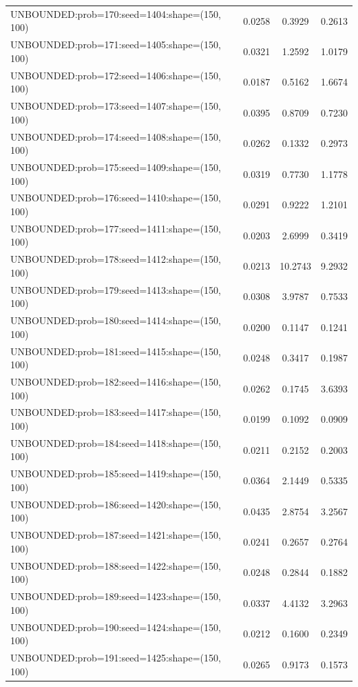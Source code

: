 \begin{longtable}{lccc}
UNBOUNDED:prob=170:seed=1404:shape=(150, 100) &   0.0258 &  0.3929 &  0.2613 \\
UNBOUNDED:prob=171:seed=1405:shape=(150, 100) &   0.0321 &  1.2592 &  1.0179 \\
UNBOUNDED:prob=172:seed=1406:shape=(150, 100) &   0.0187 &  0.5162 &  1.6674 \\
UNBOUNDED:prob=173:seed=1407:shape=(150, 100) &   0.0395 &  0.8709 &  0.7230 \\
UNBOUNDED:prob=174:seed=1408:shape=(150, 100) &   0.0262 &  0.1332 &  0.2973 \\
UNBOUNDED:prob=175:seed=1409:shape=(150, 100) &   0.0319 &  0.7730 &  1.1778 \\
UNBOUNDED:prob=176:seed=1410:shape=(150, 100) &   0.0291 &  0.9222 &  1.2101 \\
UNBOUNDED:prob=177:seed=1411:shape=(150, 100) &   0.0203 &  2.6999 &  0.3419 \\
UNBOUNDED:prob=178:seed=1412:shape=(150, 100) &   0.0213 & 10.2743 &  9.2932 \\
UNBOUNDED:prob=179:seed=1413:shape=(150, 100) &   0.0308 &  3.9787 &  0.7533 \\
UNBOUNDED:prob=180:seed=1414:shape=(150, 100) &   0.0200 &  0.1147 &  0.1241 \\
UNBOUNDED:prob=181:seed=1415:shape=(150, 100) &   0.0248 &  0.3417 &  0.1987 \\
UNBOUNDED:prob=182:seed=1416:shape=(150, 100) &   0.0262 &  0.1745 &  3.6393 \\
UNBOUNDED:prob=183:seed=1417:shape=(150, 100) &   0.0199 &  0.1092 &  0.0909 \\
UNBOUNDED:prob=184:seed=1418:shape=(150, 100) &   0.0211 &  0.2152 &  0.2003 \\
UNBOUNDED:prob=185:seed=1419:shape=(150, 100) &   0.0364 &  2.1449 &  0.5335 \\
UNBOUNDED:prob=186:seed=1420:shape=(150, 100) &   0.0435 &  2.8754 &  3.2567 \\
UNBOUNDED:prob=187:seed=1421:shape=(150, 100) &   0.0241 &  0.2657 &  0.2764 \\
UNBOUNDED:prob=188:seed=1422:shape=(150, 100) &   0.0248 &  0.2844 &  0.1882 \\
UNBOUNDED:prob=189:seed=1423:shape=(150, 100) &   0.0337 &  4.4132 &  3.2963 \\
UNBOUNDED:prob=190:seed=1424:shape=(150, 100) &   0.0212 &  0.1600 &  0.2349 \\
UNBOUNDED:prob=191:seed=1425:shape=(150, 100) &   0.0265 &  0.9173 &  0.1573 \\

\end{longtable}
